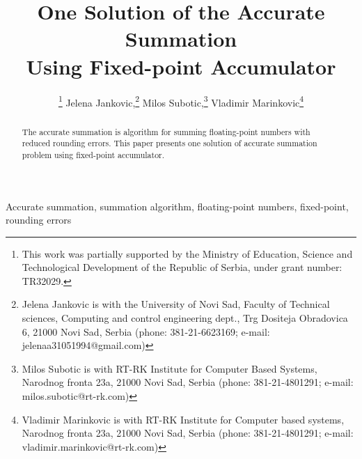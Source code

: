 \documentclass[conference]{IEEEtran}
\begin{document}
%
\title{One Solution of the Accurate Summation \\ Using Fixed-point Accumulator}


\author{
	\thanks{
		This work was partially supported by the Ministry of Education, 
		Science and Technological Development of the Republic of Serbia, 
		under grant number: TR32029.
	}
	Jelena Jankovic,\thanks{
		Jelena Jankovic is with the University of Novi Sad, Faculty of Technical sciences, 
		Computing and control engineering dept., 
		Trg Dositeja Obradovica 6, 21000 Novi Sad, Serbia
		(phone: 381-21-6623169; e-mail: jelenaa31051994@gmail.com)
	}
	Milos Subotic,\thanks{
		Milos Subotic is with RT-RK Institute for Computer Based Systems,
		Narodnog fronta 23a, 21000 Novi Sad, Serbia
		(phone: 381-21-4801291; e-mail: milos.subotic@rt-rk.com)
	}
	Vladimir Marinkovic\thanks{
		Vladimir Marinkovic is with RT-RK Institute for Computer based systems,
		Narodnog fronta 23a, 21000 Novi Sad, Serbia
		(phone: 381-21-4801291; e-mail: vladimir.marinkovic@rt-rk.com)
	}
}


\maketitle


\begin{abstract}
The accurate summation is algorithm for summing floating-point numbers with reduced rounding errors.
This paper presents one solution of accurate summation problem using fixed-point accumulator.
\end{abstract}

\begin{IEEEkeywords}
Accurate summation, summation algorithm, floating-point numbers, fixed-point, rounding errors
\end{IEEEkeywords}
\end{document}
